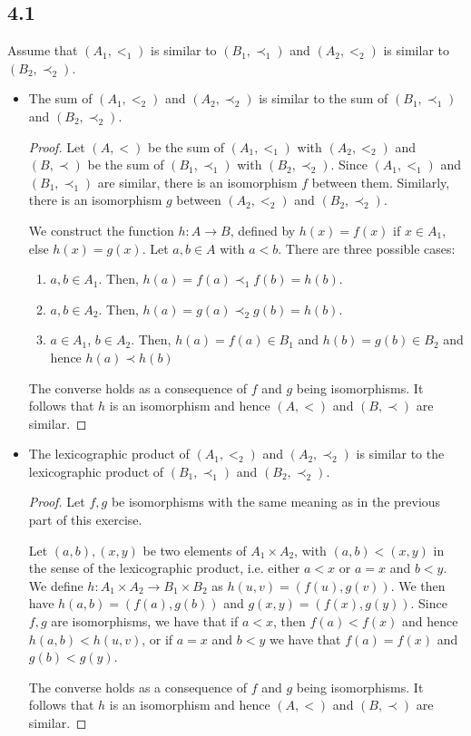\subsection*{4.1}

 Assume that $(A_1, <_1)$ is similar to $(B_1, \prec_1)$ and $(A_2, <_2)$ is similar to $(B_2, \prec_2)$.

\begin{itemize}
    \item The sum of $(A_1, <_2)$ and $(A_2, \prec_2)$ is similar to the sum of $(B_1, \prec_1)$ and $(B_2, \prec_2)$. 
    
    \begin{proof}
    Let $(A, <)$ be the sum of $(A_1, <_1)$ with $(A_2, <_2)$ and $(B, \prec)$ be the sum of $(B_1, \prec_1)$ with $(B_2, \prec_2)$. Since $(A_1, <_1)$ and $(B_1, \prec_1)$ are similar, there is an isomorphism $f$ between them. Similarly, there is an isomorphism $g$ between $(A_2, <_2)$ and $(B_2, \prec_2)$.
    
    We construct the function $h: A \rightarrow B$, defined by $h(x) = f(x)$ if $x \in A_1$, else $h(x) = g(x)$. Let $a, b \in A$ with $a < b$. There are three possible cases:
    \begin{enumerate}
        \item $a, b \in A_1$. Then, $h(a) = f(a) \prec_1 f(b) = h(b)$.
        \item $a, b \in A_2$. Then, $h(a) = g(a) \prec_2 g(b) = h(b)$.
        \item $a \in A_1$, $b \in A_2$. Then, $h(a) = f(a) \in B_1$ and $h(b) = g(b) \in B_2$ and hence $h(a) \prec h(b)$
    \end{enumerate}
    
    The converse holds as a consequence of $f$ and $g$ being isomorphisms. It follows that $h$ is an isomorphism and hence $(A, <)$ and $(B, \prec)$ are similar.
    \end{proof}
    
    \item The lexicographic product of $(A_1, <_2)$ and $(A_2, \prec_2)$ is similar to the lexicographic product of $(B_1, \prec_1)$ and $(B_2, \prec_2)$.
    
    \begin{proof}
    Let $f,g$ be isomorphisms with the same meaning as in the previous part of this exercise.
    
    Let $(a,b), (x,y)$ be two elements of $A_1 \times A_2$, with $(a,b) < (x,y)$ in the sense of the lexicographic product, i.e. either $a < x$ or $a=x$ and $b < y$. We define $h: A_1 \times A_2 \rightarrow B_1 \times B_2$ as $h(u,v) = (f(u), g(v))$. We then have $h(a,b) = (f(a), g(b))$ and $g(x,y) = (f(x), g(y))$. Since $f,g$ are isomorphisms, we have that if $a < x$, then $f(a) < f(x)$ and hence $h(a,b) < h(u,v)$, or if $a = x$ and $b < y$ we have that $f(a) = f(x)$ and $g(b) < g(y)$. 
    
    The converse holds as a consequence of $f$ and $g$ being isomorphisms. It follows that $h$ is an isomorphism and hence $(A, <)$ and $(B, \prec)$ are similar.
    \end{proof}
\end{itemize}

